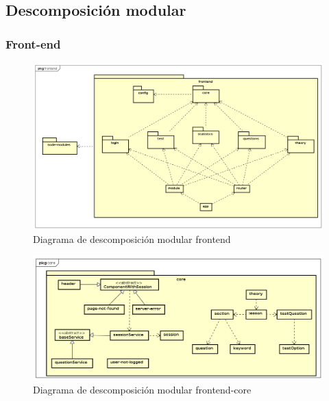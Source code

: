 \documentclass[openright,twoside,10pt]{book}
\begin{document}
    \vspace*{\fill} \newpage
    
    \subsection{Descomposición modular}\label{descomposiciuxf3n-modular}
    
    \subsubsection{Front-end}\label{front-end}
    
    \vspace*{\fill}
    
    \begin{figure}[H]
        \begin{center}
            \includegraphics[width=\textwidth]{img/astah/disenio/descomposicion/front/descomposicion.png}
        \end{center}
        \caption{Diagrama de descomposición modular frontend}
    \end{figure}
    
    \vspace*{\fill} \newpage
    
    \vspace*{\fill}
    
    \begin{figure}[H]
        \begin{center}
            \includegraphics[width=\textwidth]{img/astah/disenio/descomposicion/front/core.png}
        \end{center}
        \caption{Diagrama de descomposición modular frontend-core}
    \end{figure}
    
\end{document}
